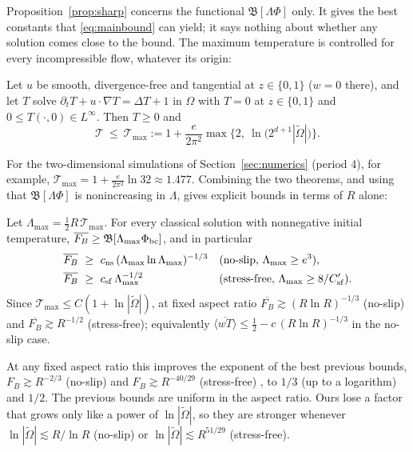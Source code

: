 Proposition~\ref{prop:sharp} concerns the functional $\mathfrak B[\Lambda\Phi]$ only. It gives the best
constants that \eqref{eq:mainbound} can yield; it says nothing about whether any solution comes close to the
bound. The maximum temperature is controlled for every incompressible flow, whatever its origin:

\begin{theorem}\label{thm:Linfty}
Let $u$ be smooth, divergence-free and tangential at $z\in\{0,1\}$ ($w=0$ there), and let $T$ solve
$\partial_tT+u\cdot\nabla T=\Delta T+1$ in $\Omega$ with $T=0$ at $z\in\{0,1\}$ and $0\le T(\cdot,0)\in L^\infty$.
Then $T\ge0$ and
\begin{equation}\label{eq:Tbound}
\mathcal T\ \le\ \mathcal T_{\max}:=1+\frac{e}{2\pi^2}\max\big\{2,\ \ln\!\big(2^{d+1}|\tilde\Omega|\big)\big\}.
\end{equation}
\end{theorem}

For the two-dimensional simulations of Section~\ref{sec:numerics} (period 4), for example,
$\mathcal T_{\max}=1+\frac{e}{2\pi^2}\ln32\approx1.477$. Combining the two theorems, and using that
$\mathfrak B[\Lambda\Phi]$ is nonincreasing in $\Lambda$, gives explicit bounds in terms of $R$ alone:

\begin{corollary}\label{cor:R}
Let $\Lambda_{\max}=\tfrac12R\,\mathcal T_{\max}$. For every classical solution with nonnegative initial
temperature, $\overline{F_B}\ge\mathfrak B[\Lambda_{\max}\Phi_{\rm bc}]$, and in particular
\begin{align*}
\overline{F_B}&\ \ge\ c_{\rm ns}\,(\Lambda_{\max}\ln\Lambda_{\max})^{-1/3}&&\text{(no-slip, }\Lambda_{\max}\ge e^3),\\
\overline{F_B}&\ \ge\ c_{\rm sf}\,\Lambda_{\max}^{-1/2}&&\text{(stress-free, }\Lambda_{\max}\ge8/C'_{\rm sf}).
\end{align*}
Since $\mathcal T_{\max}\le C(1+\ln|\tilde\Omega|)$, at fixed aspect ratio $\overline{F_B}\gtrsim(R\ln R)^{-1/3}$
(no-slip) and $\overline{F_B}\gtrsim R^{-1/2}$ (stress-free); equivalently
$\overline{\langle wT\rangle}\le\tfrac12-c\,(R\ln R)^{-1/3}$ in the no-slip case.
\end{corollary}

At any fixed aspect ratio this improves the exponent of the best previous bounds, $F_B\gtrsim R^{-2/3}$
(no-slip) and $F_B\gtrsim R^{-40/29}$ (stress-free) \citep{ArslanRojas2025}, to $1/3$ (up to a logarithm)
and $1/2$. The previous bounds are uniform in the aspect ratio. Ours lose a factor that grows only like a
power of $\ln|\tilde\Omega|$, so they are stronger whenever $\ln|\tilde\Omega|\lesssim R/\ln R$ (no-slip) or
$\ln|\tilde\Omega|\lesssim R^{51/29}$ (stress-free).

